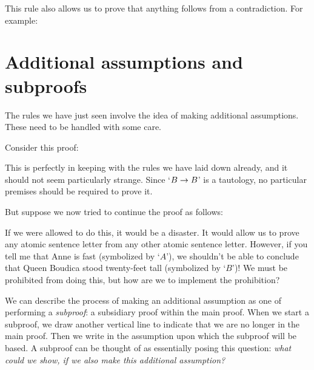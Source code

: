 This rule also allows us to prove that anything follows from a contradiction. For example:
	\begin{pf}
		\open
		\close
	\end{pf}
	
\section{Additional assumptions and subproofs}
The rules we have just seen involve the idea of making additional assumptions. These need to be handled with some care.

Consider this proof:
\begin{pf}
	\hypo{a}{A}
	\open
		\hypo{b1}{B}
		 \Reiteration{b1}
	\close
	\ci{b1-b2}
\end{pf}
This is perfectly in keeping with the rules we have laid down already, and it should not seem particularly strange. Since `$B \rightarrow B$' is a tautology, no particular premises should be required to prove it.

But suppose we now tried to continue the proof as follows:
\begin{pf}
	\open
		 
	\close
\end{pf}
If we were allowed to do this, it would be a disaster. It would allow us to prove any atomic sentence letter from any other atomic sentence letter. However, if you tell me that Anne is fast (symbolized by `$A$'), we shouldn't be able to conclude that Queen Boudica stood twenty-feet tall (symbolized by `$B$')! We must be prohibited from doing this, but how are we to implement the prohibition?

We can describe the process of making an additional assumption as one of performing a \emph{subproof}: a subsidiary proof within the main proof. When we start a subproof, we draw another vertical line to indicate that we are no longer in the main proof. Then we write in the assumption upon which the subproof will be based. A subproof can be thought of as essentially posing this question: \emph{what could we show, if we also make this additional assumption?}

